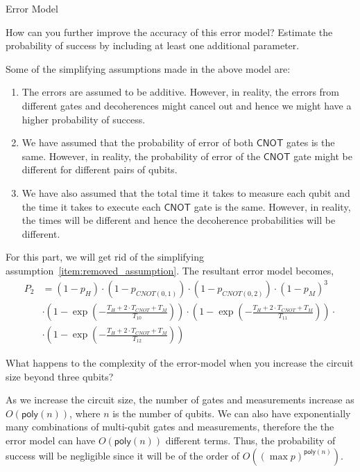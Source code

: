 \begin{solution}{Error Model}
    \begin{question}
        How can you further improve the accuracy of this error model? Estimate the probability of success by including at least one additional parameter.
    \end{question}
    \begin{answer}
        Some of the simplifying assumptions made in the above model are:
        \begin{enumerate}
            \item The errors are assumed to be additive. However, in reality, the errors from different gates and decoherences might cancel out and hence we might have a higher probability of success.
            \item \label{item:removed_assumption} We have assumed that the probability of error of both $\mathsf{CNOT}$ gates is the same. However, in reality, the probability of error of the $\mathsf{CNOT}$ gate might be different for different pairs of qubits.
            \item We have also assumed that the total time it takes to measure each qubit and the time it takes to execute each $\mathsf{CNOT}$ gate is the same. However, in reality, the times will be different and hence the decoherence probabilities will be different.
        \end{enumerate}

        For this part, we will get rid of the simplifying assumption~\ref{item:removed_assumption}. The resultant error model becomes,
        \begin{equation}
            \begin{split}
            P_2 &= (1-p_H)\cdot(1-p_{CNOT(0, 1)})\cdot(1-p_{CNOT(0,2)})\cdot(1-p_M)^3\\
            &\cdot \left(1 - \exp\left(-\frac{T_H + 2\cdot T_{CNOT} + T_M}{T_{10}}\right)\right)\cdot \left(1 - \exp\left(-\frac{T_H + 2\cdot T_{CNOT} + T_M}{T_{11}}\right)\right)\cdot\\
                & \cdot \left(1 - \exp\left(-\frac{T_H + 2\cdot T_{CNOT} + T_M}{T_{12}}\right)\right) 
            \end{split}
        \end{equation}
    \end{answer}

    \tcbline

    \begin{question}
        What happens to the complexity of the error-model when you increase the circuit size beyond three qubits?
    \end{question}
    \begin{answer}
        As we increase the circuit size, the number of gates and measurements increase as $O(\mathsf{poly}(n))$, where $n$ is the number of qubits. We can also have exponentially many combinations of multi-qubit gates and measurements, therefore the the error model can have $O(\mathsf{poly}(n))$ different terms. Thus, the probability of success will be negligible since it will be of the order of $O(\left(\max{p}\right)^{\mathsf{poly}(n)})$.
    \end{answer}
\end{solution}
